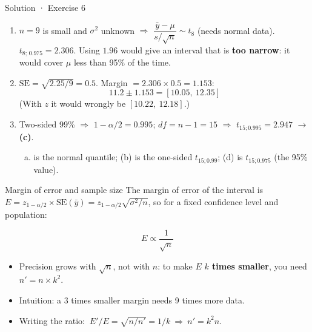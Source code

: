 \documentclass[
  11pt,
  ignorenonframetext,
  aspectratio=169,
]{beamer}
\providecommand{\tightlist}{%
  \setlength{\itemsep}{0pt}\setlength{\parskip}{0pt}}
\newcommand{\se}{\mathrm{SE}}
\begin{document}
\begin{frame}{Solution · Exercise 6}
\protect{}\label{solution-exercise-6}
\begin{enumerate}
\item
  \(n=9\) is small and \(\sigma^2\) unknown \(\Rightarrow\)
  \(\dfrac{\bar y-\mu}{s/\sqrt n}\sim t_{8}\) (needs normal data).
  \(t_{8;\,0.975}=\mathbf{2.306}\). Using \(1.96\) would give an
  interval that is \textbf{too narrow}: it would cover \(\mu\) less than
  95\% of the time.
\item
  \(\se=\sqrt{2.25/9}=0.5\). Margin \(=2.306\times0.5=1.153\):
  \[11.2\pm1.153=\mathbf{[10.05,\ 12.35]}\] (With \(z\) it would wrongly
  be \([10.22,\ 12.18]\).)
\item
  Two-sided 99\% \(\Rightarrow\) \(1-\alpha/2=0.995\); \(df=n-1=15\)
  \(\Rightarrow\) \(t_{15;0.995}=\mathbf{2.947}\) \(\to\) \textbf{(c)}.

  \begin{enumerate}
  [(a)]
  \tightlist
  \item
    is the normal quantile; (b) is the one-sided \(t_{15;0.99}\); (d) is
    \(t_{15;0.975}\) (the 95\% value).
  \end{enumerate}
\end{enumerate}
\end{frame}


\begin{frame}{Margin of error and sample size}
\protect{}\label{margin-of-error-and-sample-size}
The margin of error of the interval is
\(E=z_{1-\alpha/2}\times\se(\bar y)=z_{1-\alpha/2}\sqrt{\sigma^2/n}\), so
for a fixed confidence level and population:

\[E\propto\frac{1}{\sqrt n}\]

\begin{itemize}
\tightlist
\item
  Precision grows with \(\sqrt n\), not with \(n\): to make \(E\)
  \textbf{\(k\) times smaller}, you need \(n'=n\times k^2\).
\item
  Intuition: a 3 times smaller margin needs 9 times more data.
\item
  Writing the ratio: \(\ E'/E=\sqrt{n/n'}=1/k\ \Rightarrow\ n'=k^2 n\).
\end{itemize}
\end{frame}
\end{document}
